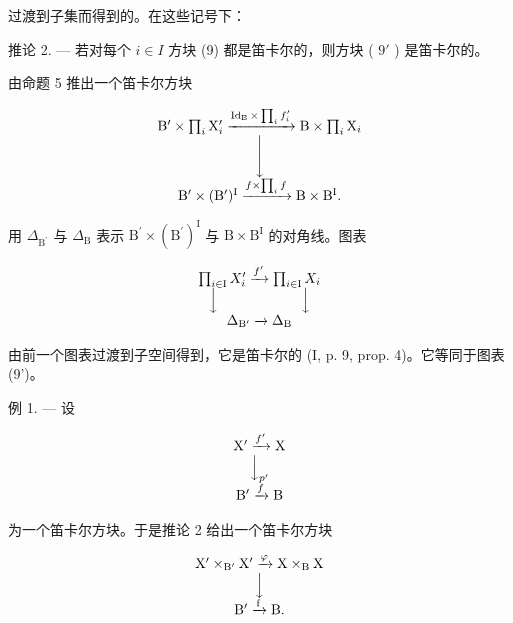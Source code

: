 过渡到子集而得到的。在这些记号下：

推论 2. --- 若对每个 \(i \in I\) 方块 (9) 都是笛卡尔的，则方块 ( \(9'\) ) 是笛卡尔的。

由命题 5 推出一个笛卡尔方块

\[
\begin{array}{c} \mathrm{B} ^ {\prime} \times \prod_ {i} \mathrm{X} _ {i} ^ {\prime} \xrightarrow {\operatorname{Id} _ {\mathrm{B}} \times \prod_ {i} f _ {i} ^ {\prime}} \mathrm{B} \times \prod_ {i} \mathrm{X} _ {i} \\ \Biggl \downarrow \\ \mathrm{B} ^ {\prime} \times (\mathrm{B} ^ {\prime}) ^ {\mathrm{I}} \xrightarrow {f \times \prod_ {i} f} \mathrm{B} \times \mathrm{B} ^ {\mathrm{I}}  . \end{array}
\]

用 \(\Delta_{\mathrm{B}^{\prime}}\) 与 \(\Delta_{\mathrm{B}}\) 表示 \(\mathrm{B}^{\prime}\times (\mathrm{B}^{\prime})^{\mathrm{I}}\) 与 \(\mathrm{B}\times \mathrm{B}^{\mathrm{I}}\) 的对角线。图表

\[
\begin{array}{c} \prod_ {i \in \mathrm{I}} X _ {i} ^ {\prime} \xrightarrow {f ^ {\prime}} \prod_ {i \in \mathrm{I}} X _ {i} \\ \Big \downarrow \qquad \qquad \qquad \Big \downarrow \\ \Delta_ {\mathrm{B} ^ {\prime}} \xrightarrow {} \Delta_ {\mathrm{B}} \end{array}
\]

由前一个图表过渡到子空间得到，它是笛卡尔的 (I, p. 9, prop. 4)。它等同于图表 (9')。

例 1. --- 设

\[
\begin{array}{c} \mathrm {X^ {\prime}} \xrightarrow {f ^ {\prime}} \mathrm{X} \\ \Big \downarrow_ {p ^ {\prime}} \\ \mathrm {B^ {\prime}} \xrightarrow {f} \mathrm{B} \end{array}
\]

为一个笛卡尔方块。于是推论 2 给出一个笛卡尔方块

\[
\begin{array}{c} \mathrm {X^ {\prime} \times_ {B^ {\prime}} X^ {\prime}} \xrightarrow {\varphi} \mathrm {X\times_ {B} X} \\ \Big \downarrow \\ \mathrm {B^ {\prime} \xrightarrow {f} B}. \end{array}
\]

